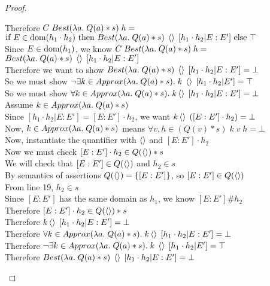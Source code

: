 \begin{proof}
\begin{tabbedproof}
    \oooooo Therefore $C\;Best(\lambda a.\;Q(a) * s)\;h = $ \\
    \oooooox $\mbox{if }E\in\mbox{dom}({h_1 \cdot h_2}) \mbox{ then }Best(\lambda a.\;Q(a) * s)\;\left<\right>\;[h_1 \cdot h_2|E:E'] \mbox{ else } \top$ \\
    \oooooo Since $E \in \mbox{dom}({h_1})$, we know $C\;Best(\lambda a.\;Q(a) * s)\;h = $ \\
    \oooooox $Best(\lambda a.\;Q(a) * s)\;\left<\right>\;[h_1 \cdot h_2|E:E']$ \\
    \oooooo Therefore we want to show $Best(\lambda a.\;Q(a) * s)\;\left<\right>\;[h_1 \cdot h_2|E:E'] = \bot$ \\
    \oooooo So we must show $\lnot \exists k \in Approx(\lambda a.\;Q(a) * s).\; k\;\left<\right>\;[h_1 \cdot h_2|E'] = \top$ \\
    \oooooo So we must show $\forall k \in Approx(\lambda a.\;Q(a) * s).\; k\left<\right>\;[h_1\cdot h_2|E:E'] = \bot$ \\
    \oooooo Assume $k \in Approx(\lambda a.\;Q(a) * s)$ \\
    \ooooooo Since $[h_1\cdot h_2|E:E'] = [E:E']\cdot h_2$, we want 
             $k\left<\right>\;([E:E']\cdot h_2) = \bot$ \\
    \ooooooo Now, $k \in Approx(\lambda a.\;Q(a) * s)$ means $\forall v, h \in (Q(v) * s)\; k\;v\;h = \bot$ \\
    \ooooooo Now, instantiate the quantifier with $\left<\right>$ and $[E:E']\cdot h_2$ \\
    \ooooooo Now we must check $[E:E']\cdot h_2 \in Q(\left<\right>) * s$ \\
    \ooooooo We will check that $[E:E'] \in Q(\left<\right>)$ and $h_2 \in s$ \\
    \ooooooo By semantics of assertions $Q(\left<\right>) = \{{[E:E']}\}$, so $[E:E'] \in Q(\left<\right>)$ \\
    \ooooooo From line 19, $h_2 \in s$ \\
    \ooooooo Since $[E:E']$ has the same domain as $h_1$, we know $[E:E'] \# h_2$ \\
    \ooooooo Therefore $[E:E']\cdot h_2 \in Q(\left<\right>) * s$ \\
    \ooooooo Therefore $k\left<\right>\;[h_1\cdot h_2|E:E'] = \bot$ \\
    \oooooo Therefore $\forall k \in Approx(\lambda a.\;Q(a) * s).\; k\left<\right>\;[h_1\cdot h_2|E:E'] = \bot$ \\
    \oooooo Therefore $\lnot \exists k \in Approx(\lambda a.\;Q(a) * s).\; k\;\left<\right>\;[h_1 \cdot h_2|E'] = \top$ \\
    \oooooo Therefore $Best(\lambda a.\;Q(a) * s)\;\left<\right>\;[h_1 \cdot h_2|E:E'] = \bot$ \\

\end{tabbedproof}
\end{proof}
